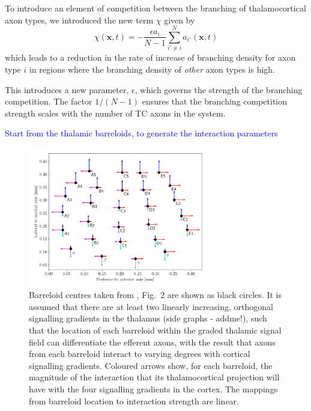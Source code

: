 \documentclass[a4paper,11pt]{article}
\newcommand{\cmnt}[1]{\textcolor{blue}{#1}}
\newcommand{\e}{\emph}
\newcommand{\mb}[1]{\mathbf{#1}}
\begin{document}
To introduce an element of competition between the branching of
thalamocortical axon types, we introduced the new term $\chi$ given by
%
\begin{equation} \label{eq:branch_comp}
\chi(\mb{x}, t) = - \frac{\epsilon  a_i}{N-1} \sum_{i' \ne i}^{N} a_{i'}(\mb{x}, t)
\end{equation}
%
which leads to a reduction in the rate of increase of branching density for
axon type $i$ in regions where the branching density of \e{other} axon
types is high.

This introduces a new parameter, $\epsilon$, which governs the
strength of the branching competition. The factor $1/(N-1)$ ensures that the
branching competition strength scales with the number of TC axons in the
system.

\cmnt{Start from the thalamic barreloids, to generate the interaction
  parameters}

\begin{figure}
\begin{center}
\includegraphics[width=0.7\textwidth]{../boundaries/barreloids_vanderloos_graph.png}
\end{center}
\caption{Barreloid centres taken from \cite{van_der_loos_barreloids_1976}, Fig.~2
  are shown as black circles. It is assumed that there are at least
  two linearly increasing, orthogonal signalling gradients in the
  thalamus (side graphs - addme!), such that the location of each
  barreloid within the graded thalamic signal field can differentiate
  the efferent axons, with the result that axons from each barreloid
  interact to varying degrees with cortical signalling
  gradients. Coloured arrows show, for each barreloid, the magnitude
  of the interaction that its thalamocortical projection will have
  with the four signalling gradients in the cortex. The mappings from
  barreloid location to interaction strength are linear.}
\label{fig:barreloids}
\end{figure}
\end{document}
